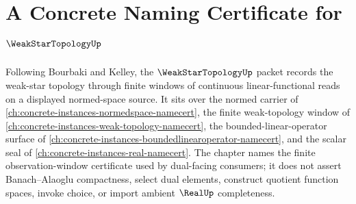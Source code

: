 \chapter{A Concrete Naming Certificate for $\WeakStarTopologyUp$}
\label{ch:concrete-instances-weak-star-topology-namecert}

Following Bourbaki and Kelley, the $\WeakStarTopologyUp$ packet records the weak-star topology through finite windows of continuous linear-functional reads on a displayed normed-space source. It sits over the normed carrier of \autoref{ch:concrete-instances-normedspace-namecert}, the finite weak-topology window of \autoref{ch:concrete-instances-weak-topology-namecert}, the bounded-linear-operator surface of \autoref{ch:concrete-instances-boundedlinearoperator-namecert}, and the scalar seal of \autoref{ch:concrete-instances-real-namecert}. The chapter names the finite observation-window certificate used by dual-facing consumers; it does not assert Banach--Alaoglu compactness, select dual elements, construct quotient function spaces, invoke choice, or import ambient $\RealUp$ completeness.

